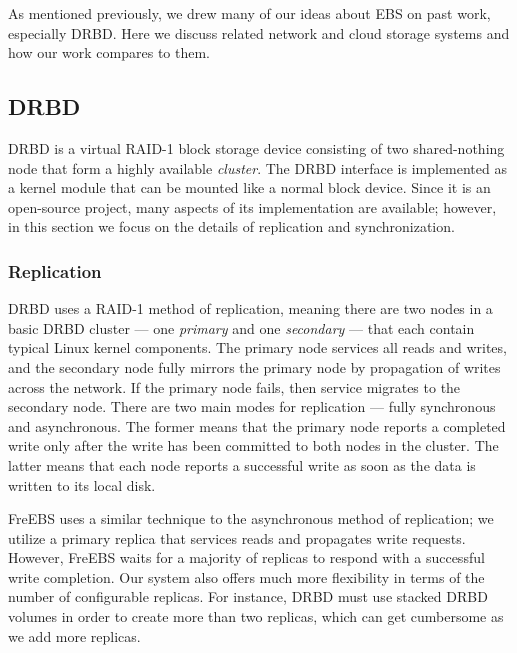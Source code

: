 As mentioned previously, we drew many of our ideas about EBS on past 
work, especially DRBD\textsuperscript{\textregistered}. Here we 
discuss related network and cloud storage systems and how our work 
compares to them. 

\subsection{DRBD}
\label{sec:drbd}
DRBD\textsuperscript{\textregistered} is a virtual RAID-1 block storage 
device consisting of two shared-nothing node that form a highly available
\emph{cluster}. The DRBD\textsuperscript{\textregistered} interface is 
implemented as a kernel module that can be mounted like a normal block 
device. Since it is an open-source project, many aspects of its 
implementation are available; however, in this section we focus on the
details of replication and synchronization.

\subsubsection{Replication}
DRBD\textsuperscript{\textregistered} uses a RAID-1 method of replication, 
meaning there are two nodes in a basic DRBD\textsuperscript{\textregistered} 
cluster --- one \emph{primary} and one \emph{secondary} --- that each
contain typical Linux kernel components\cite{drbd, drbd_manual}. The 
primary node 
services all reads and writes, and the secondary node fully mirrors the 
primary node by propagation of writes across the network. If the primary 
node fails, then service migrates to the secondary node. There are two 
main modes for replication --- fully synchronous and asynchronous. 
The former means that the primary node reports a completed write only after 
the write has been committed to both nodes in the cluster. The latter means 
that each node reports a successful write as soon as the data is written to 
its local disk. 

FreEBS uses a similar technique to the asynchronous method of replication;
we utilize a primary replica that services reads and propagates write 
requests. However, FreEBS waits for a majority of replicas to respond with a
successful write completion. Our system also offers much more flexibility in 
terms of the number of configurable replicas. For instance, 
DRBD\textsuperscript{\textregistered} must use 
stacked DRBD volumes in order to create more than two replicas, which can 
get cumbersome as we add more replicas.

